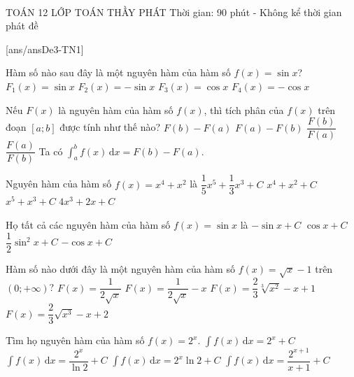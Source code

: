 ﻿﻿\begin{name}
	{\tenchude}
	{TOÁN 12}
	{LỚP TOÁN THẦY PHÁT}
	{Thời gian: 90 phút - Không kể thời gian phát đề}
\end{name}
\TN
{}[ans/ansDe3-TN1]
\begin{ex}%
	Hàm số nào sau đây là một nguyên hàm của hàm số $f(x) = \sin x$?
	\choice
	{$F_{1}(x) = \sin x$}
	{$F_{2}(x) = -\sin x$}
	{$F_{3}(x) = \cos x$}
	{\True $F_{4}(x) = -\cos x$}
\end{ex}

\begin{ex}%
	Nếu $F(x)$ là nguyên hàm của hàm số $f(x)$, thì tích phân của $f(x)$ trên đoạn $[a;b]$ được tính như thế nào?
	\choice
	{\True $F(b)-F(a)$}
	{$F(a)-F(b)$}
	{$\dfrac{F(b)}{F(a)}$}
	{$\dfrac{F(a)}{F(b)}$}
	\loigiai
	{ Ta có
		$\displaystyle\int_{a}^{b} f(x) \mathrm{\,d}x = F(b) - F(a)$.
	}
\end{ex}

\begin{ex}%
	Nguyên hàm của hàm số $f(x)=x^4+x^2$ là
	\choice
	{\True $\dfrac{1}{5}x^5+\dfrac{1}{3}x^3+C$}
	{$x^4+x^2+C$}
	{$x^5+x^3+C$}
	{$4x^3+2x+C$}
\end{ex}

\begin{ex}%
	Họ tất cả các nguyên hàm của hàm số $f(x)=\sin x$ là
	\choice
	{$-\sin x+C$}
	{$\cos x+C$}
	{$\dfrac{1}{2}\sin^2x+C$}
	{\True $-\cos x+C$}
\end{ex}

\begin{ex}%
	Hàm số nào dưới đây là một nguyên hàm của hàm số $f(x)=\sqrt{x}-1$ trên $(0;+\infty)$?
	\choice
	{$F(x)=\dfrac{1}{2\sqrt{x}}$}
	{$F(x)=\dfrac{1}{2\sqrt{x}}-x$}
	{$F(x)=\dfrac{2}{3}\sqrt[3]{x^2}-x+1$}
	{\True $F(x)=\dfrac{2}{3}\sqrt{x^3}-x+2$}
\end{ex}

\begin{ex}%
	Tìm họ nguyên hàm của hàm số $f(x)=2^x$.
	\choice
	{$\displaystyle\int f(x)\mathrm{\,d}x=2^x+C$}
	{\True $\displaystyle\int f(x)\mathrm{\,d}x=\dfrac{2^x}{\ln 2}+C$}
	{$\displaystyle\int f(x)\mathrm{\,d}x=2^x\ln 2+C$}
	{$\displaystyle\int f(x)\mathrm{\,d}x=\dfrac{2^{x+1}}{x+1}+C$}
\end{ex}

